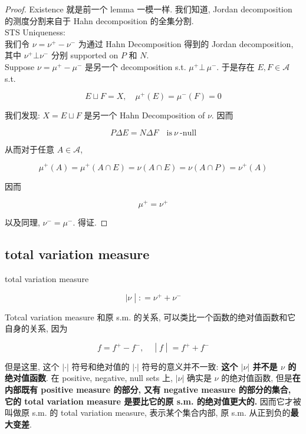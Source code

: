 \documentclass{qlnotes-export}
\begin{document}
\begin{proof}

Existence 就是前一个 lemma 一模一样. 我们知道, Jordan decomposition 的测度分割来自于 Hahn decomposition 的全集分割.\\
STS Uniqueness:\\
我们令 \(\nu = \nu^{+} - \nu^{-}\) 为通过 Hahn Decomposition 得到的 Jordan decomposition, 其中 \(\nu^{+}\bot\nu^{-}\) 分别 supported on \(P\) 和 \(N\).\\
Suppose \(\nu = \mu^{+} - \mu^{-}\) 是另一个 decomposition s.t. \(\mu^{+}\bot\,\mu^{-}\). 于是存在 \(E,F \in \mathcal{A}\) s.t.

\[E \sqcup F = X,\quad\mu^{+}(E) = \mu^{-}(F) = 0\]

我们发现: \(X = E \sqcup F\) 是另一个 Hahn Decomposition of \(\nu\). 因而

\[P\Delta E = N\Delta F\quad\text{is}\ \nu\ \text{-null}\]

从而对于任意 \(A \in \mathcal{A}\),

\[\mu^{+}(A) = \mu^{+}(A \cap E) = \nu(A \cap E) = \nu(A \cap P) = \nu^{+}(A)\]

因而

\[\mu^{+} = \nu^{+}\]

以及同理, \(\nu^{-} = \mu^{-}\). 得证.

\end{proof}

\subsection{total variation measure}\label{total-variation-measure}

\begin{definition}{total variation measure}\label{def-10-signed-measure-jordan-decomposition-total-variation-measure}

\[\left. |\nu \middle| : = \nu^{+} + \nu^{-} \right.\]

\end{definition}

Totcal variation measure 和原 s.m. 的关系, 可以类比一个函数的绝对值函数和它自身的关系, 因为

\[\left. f = f^{+} - f^{-},\quad \middle| f \middle| = f^{+} + f^{-} \right.\]

但是这里, 这个 \(| \cdot |\) 符号和绝对值的 \(| \cdot |\) 符号的意义并不一致: \textbf{这个 \(|\nu|\) 并不是 \(\nu\) 的绝对值函数}. 在 positive, negative, null sets 上, \(|\nu|\) 确实是 \(\nu\) 的绝对值函数, 但是\textbf{在内部既有 positive measure 的部分, 又有 negative measure 的部分的集合, 它的 total variation measure 是要比它的原 s.m. 的绝对值更大的.} 因而它才被叫做原 s.m. 的 total variation measure, 表示某个集合内部, 原 s.m. 从正到负的\textbf{最大变差}.
\end{document}
